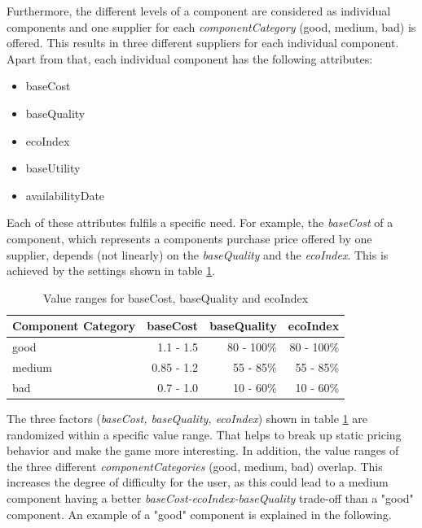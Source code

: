 Furthermore, the different levels of a component are considered as individual components and one supplier for each \textit{componentCategory} (good, medium, bad) is offered. This results in three different suppliers for each individual component.\\
Apart from that, each individual component has the following attributes:
\begin{itemize}
    \item baseCost
    \item baseQuality
    \item ecoIndex
    \item baseUtility
    \item availabilityDate
\end{itemize}
Each of these attributes fulfils a specific need. For example, the \textit{baseCost} of a component, which represents a components purchase price offered by one supplier, depends (not linearly) on the \textit{baseQuality} and the \textit{ecoIndex}. This is achieved by the settings shown in table \ref{component_price_calculation}.
    \begin{table}[ht]
    \centering
    \begin{tabular}{|l|r|r|r|}
    \hline
    Component Category & baseCost & baseQuality & ecoIndex \\
    \hline
    good & 1.1 - 1.5 & 80 - 100\% & 80 - 100\% \\
    medium & 0.85 - 1.2 & 55 - 85\% & 55 - 85\%\\
    bad  & 0.7 - 1.0 & 10 - 60\% & 10 - 60\%\\
    \hline
    \end{tabular}
    \caption{Value ranges for baseCost, baseQuality and ecoIndex}
    \label{component_price_calculation}
    \end{table}
\newline

The three factors (\textit{baseCost, baseQuality, ecoIndex}) shown in table \ref{component_price_calculation} are randomized within a specific value range. That helps to break up static pricing behavior and make the game more interesting. In addition, the value ranges of the three different \textit{componentCategories} (good, medium, bad) overlap. This increases the degree of difficulty for the user, as this could lead to a medium component having a better \textit{baseCost-ecoIndex-baseQuality} trade-off than a "good" component. An example of a "good" component is explained in the following.

